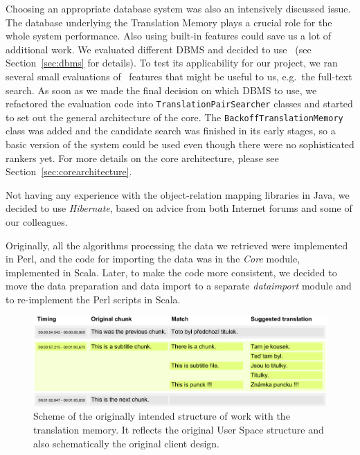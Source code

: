 Choosing an appropriate database system was also an intensively discussed issue. The database underlying the Translation Memory plays a crucial role for the whole system performance. Also using built-in features could save us a lot of additional work.
We evaluated different DBMS and decided to use \postgres~(see Section~\ref{sec:dbms} for details). To test its applicability for our project, we ran several small evaluations of \postgres~features that might be useful to us, e.g.\ the full-text search. As soon as we made the final decision on which DBMS to use, we refactored the evaluation code into {\tt TranslationPairSearcher} classes and started to set out the general architecture of the core. The {\tt BackoffTranslationMemory} class was added and the candidate search was finished in its early stages, so a basic version of the system could be used even though there were no sophisticated rankers yet. For more details on the core architecture, please see Section~\ref{sec:corearchitecture}.

Not having any experience with the object-relation mapping libraries in Java, we decided to use {\it Hibernate}, based on advice from both Internet forums and some of our colleagues.

Originally, all the algorithms processing the data we retrieved were implemented in Perl, and the code for importing the data was in the \emph{Core} module, implemented in Scala. Later, to make the code more consistent, we decided to move the data preparation and data import to a separate \emph{dataimport} module and to re-implement the Perl scripts in Scala.

\begin{figure}[h]
\begin{center}
\includegraphics{./figures/original_strucutre.pdf}
\end{center}

\caption{Scheme of the originally intended structure of work with the translation memory. It reflects the original User Space structure and also schematically the original client design.}\label{fig:original_scheme}

\end{figure}

